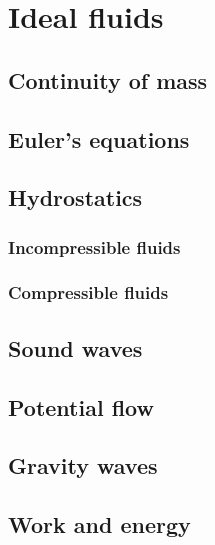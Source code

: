 \part{Ideal fluids}

\chapter{Continuity of mass}


\chapter{Euler's equations}



\chapter{Hydrostatics}

\section{Incompressible fluids}

\section{Compressible fluids}

\chapter{Sound waves}




\chapter{Potential flow}


\chapter{Gravity waves}



\chapter{Work and energy}


